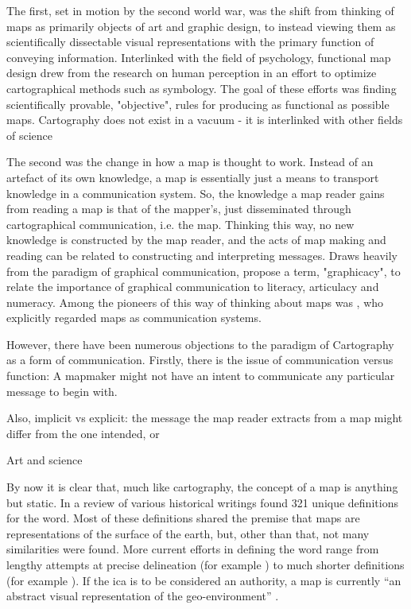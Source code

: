 The first, set in motion by the second world war, was
the shift from thinking of maps as primarily objects of art and graphic design,
to instead viewing them as scientifically dissectable visual representations
with the primary function of conveying information.
Interlinked with the field of psychology,
functional map design drew from the research on human perception
in an effort to optimize cartographical methods such as symbology.
The goal of these efforts was finding scientifically provable, "objective", rules
for producing as functional as possible maps.
Cartography does not exist in a vacuum - it is interlinked with other fields of science

The second was the change in how a map is thought to work.
Instead of an artefact of its own knowledge,
a map is essentially just a means to transport knowledge in a communication system.
So, the knowledge a map reader gains from reading a map is that of the mapper's,
just disseminated through cartographical communication, i.e. the map.
Thinking this way, no new knowledge is constructed by the map reader,  %
and the acts of map making and reading can be related to constructing and interpreting messages.
Draws heavily from the paradigm of graphical communication,  %
\textcite{bal1966} propose a term, "graphicacy",
to relate the importance of graphical communication to literacy, articulacy and numeracy.
Among the pioneers of this way of thinking about maps was \textcite{kol1969},
who explicitly regarded maps as communication systems.

However, there have been numerous objections to the paradigm of Cartography as a form of communication.
Firstly, there is the issue of communication versus function:
A mapmaker might not have an intent to communicate any particular message to begin with.

Also, implicit vs explicit:
the message the map reader extracts from a map might differ from the one intended, or


Art and science \parencite{mac2004, tyn1992}  %




By now it is clear that,
much like cartography,
the concept of a map is anything but static.
In a review of various historical writings \textcite{and1996}
found 321 unique definitions for the word.
Most of these definitions shared the premise that
maps are representations of the surface of the earth,
but, other than that, not many similarities were found.
More current efforts in defining the word range
from lengthy attempts at precise delineation (for example \textcite{ica2003})
to much shorter definitions (for example \textcite{kra2017}).
If the \acrshort{ica} is to be considered an authority, a map is currently
\enquote{an abstract visual representation of the geo-environment} \parencite{ica2019}.


